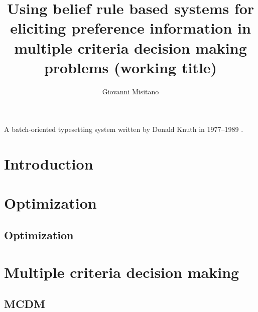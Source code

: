 \documentclass[utf8,english]{gradu3}
\begin{document}
\title{Using belief rule based systems for eliciting preference information in multiple criteria decision making problems (working title)}

\author{Giovanni Misitano}


\maketitle

\begin{thetermlist}
\item[\TeX] A batch-oriented typesetting system written by 
Donald Knuth in 1977--1989 \parencite[see][]{knuth86:_texbook}.
\end{thetermlist}

\mainmatter

\chapter{Introduction}


\chapter{Optimization}

\section{Optimization}


\chapter{Multiple criteria decision making}

\section{MCDM}

\end{document}
